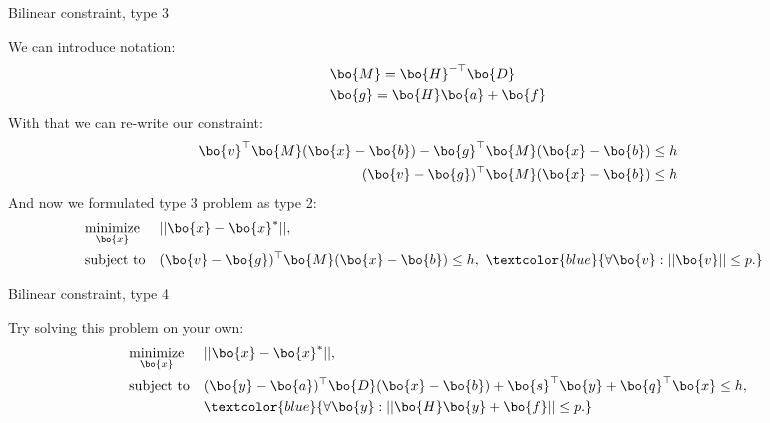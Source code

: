 \documentclass{beamer}
\begin{document}
\begin{frame}{Bilinear constraint, type 3}
\begin{flushleft}

We can introduce notation:
%
\begin{align}
    & \bo{M} = \bo{H}^{-\top} \bo{D} \\
    & \bo{g} = \bo{H}\bo{a} + \bo{f}
\end{align}
With that we can re-write our constraint:
%
\begin{align}
    \bo{v}^\top \bo{M} (\bo{x} - \bo{b}) - \bo{g}^\top \bo{M} (\bo{x} - \bo{b}) \leq h \\
    (\bo{v} - \bo{g})^\top \bo{M} (\bo{x} - \bo{b}) \leq h 
\end{align}
%
And now we formulated type 3 problem as type 2:
%
\begin{equation}
\begin{aligned}
& \underset{\bo{x}}{\text{minimize}} 
& & ||\bo{x} - \bo{x}^*||, \\
& \text{subject to}
& & (\bo{v} - \bo{g})^\top \bo{M} (\bo{x} - \bo{b}) \leq h, \ 
\textcolor{blue}{
	\forall \bo{v} : ||\bo{v}|| \leq p.} 
& & & 
\end{aligned}
\end{equation}

 
\end{flushleft}
\end{frame}



\begin{frame}{Bilinear constraint, type 4}
\begin{flushleft}

Try solving this problem on your own:
%
\begin{equation}
\begin{aligned}
& \underset{\bo{x}}{\text{minimize}} 
& & ||\bo{x} - \bo{x}^*||, \\
& \text{subject to}
& & (\bo{y} - \bo{a})^\top \bo{D} (\bo{x} - \bo{b})  + 
\bo{s}^\top \bo{y} + \bo{q}^\top \bo{x} \leq h, \\
& & &	\textcolor{blue}{
\forall \bo{y} :  ||\bo{H}\bo{y} + \bo{f}|| \leq p.} 
\end{aligned}
\end{equation}
 
\end{flushleft}
\end{frame}
\end{document}
